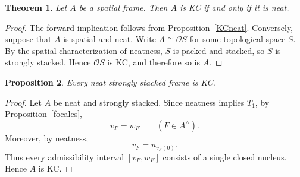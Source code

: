 \documentclass[11pt]{amsart}
\theoremstyle{plain}
\newtheorem{thm}{Theorem}[section]
\newtheorem{prop}[thm]{Proposition}
\theoremstyle{definition}
\begin{document}

\begin{thm}\label{KCiffNeat}
Let $A$ be a spatial frame. Then $A$ is
KC if and only if it is neat.
\end{thm}

\begin{proof}
The forward implication follows from
Proposition~\ref{KCneat}. Conversely,
suppose that $A$ is spatial and neat.
Write $A\cong\mathcal OS$ for some
topological space $S$.
By the spatial characterization of
neatness, $S$ is packed and stacked,
so $S$ is strongly stacked. Hence
$\mathcal OS$ is KC, and therefore
so is $A$.
\end{proof}

\begin{prop}\label{NeatSSimplicaKC}
Every neat strongly stacked frame is KC.
\end{prop}

\begin{proof}
Let $A$ be neat and strongly stacked.
Since neatness implies $T_1$, by Proposition~\ref{focales},
\[
v_F=w_F
\qquad(F\in A^\wedge).
\]
Moreover, by neatness,
\[
v_F=u_{v_F(0)}.
\]
Thus every admissibility interval
$[v_F,w_F]$ consists of a single closed
nucleus. Hence $A$ is KC.
\end{proof}
\end{document}
